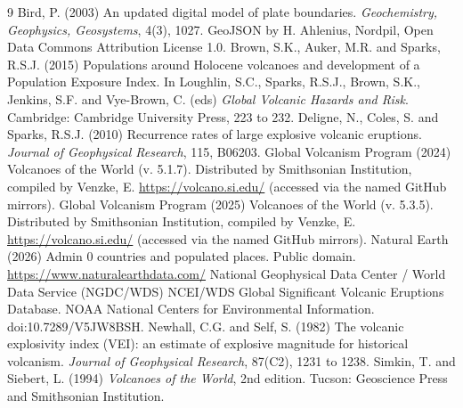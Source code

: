 \documentclass[11pt,a4paper]{article}
\begin{document}
\begin{thebibliography}{9}
 Bird, P. (2003) An updated digital model of plate boundaries. \emph{Geochemistry, Geophysics, Geosystems}, 4(3), 1027. GeoJSON by H. Ahlenius, Nordpil, Open Data Commons Attribution License 1.0.
 Brown, S.K., Auker, M.R. and Sparks, R.S.J. (2015) Populations around Holocene volcanoes and development of a Population Exposure Index. In Loughlin, S.C., Sparks, R.S.J., Brown, S.K., Jenkins, S.F. and Vye-Brown, C. (eds) \emph{Global Volcanic Hazards and Risk}. Cambridge: Cambridge University Press, 223 to 232.
 Deligne, N., Coles, S. and Sparks, R.S.J. (2010) Recurrence rates of large explosive volcanic eruptions. \emph{Journal of Geophysical Research}, 115, B06203.
 Global Volcanism Program (2024) Volcanoes of the World (v. 5.1.7). Distributed by Smithsonian Institution, compiled by Venzke, E. \url{https://volcano.si.edu/} (accessed via the named GitHub mirrors).
 Global Volcanism Program (2025) Volcanoes of the World (v. 5.3.5). Distributed by Smithsonian Institution, compiled by Venzke, E. \url{https://volcano.si.edu/} (accessed via the named GitHub mirrors).
 Natural Earth (2026) Admin 0 countries and populated places. Public domain. \url{https://www.naturalearthdata.com/}
 National Geophysical Data Center / World Data Service (NGDC/WDS) NCEI/WDS Global Significant Volcanic Eruptions Database. NOAA National Centers for Environmental Information. doi:10.7289/V5JW8BSH.
 Newhall, C.G. and Self, S. (1982) The volcanic explosivity index (VEI): an estimate of explosive magnitude for historical volcanism. \emph{Journal of Geophysical Research}, 87(C2), 1231 to 1238.
 Simkin, T. and Siebert, L. (1994) \emph{Volcanoes of the World}, 2nd edition. Tucson: Geoscience Press and Smithsonian Institution.
\end{thebibliography}
\end{document}
